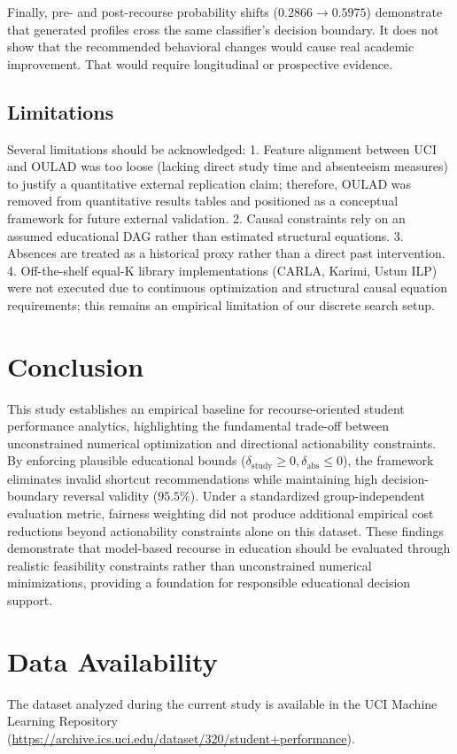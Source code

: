\documentclass[11pt]{article}
\newcommand{\hlblock}[1]{\vspace{1mm}\noindent\colorbox{yellow!30}{\parbox{\dimexpr\linewidth-2\fboxsep\relax}{\sloppy #1\par}}\vspace{1mm}}
\begin{document}
\hlblock{Finally, pre- and post-recourse probability shifts ($0.2866 \to 0.5975$) demonstrate that generated profiles cross the same classifier's decision boundary. It does not show that the recommended behavioral changes would cause real academic improvement. That would require longitudinal or prospective evidence.}

\subsection{Limitations}

Several limitations should be acknowledged:
1. Feature alignment between UCI and OULAD was too loose (lacking direct study time and absenteeism measures) to justify a quantitative external replication claim; therefore, OULAD was removed from quantitative results tables and positioned as a conceptual framework for future external validation.
2. Causal constraints rely on an assumed educational DAG rather than estimated structural equations.
3. Absences are treated as a historical proxy rather than a direct past intervention.
4. Off-the-shelf equal-K library implementations (CARLA, Karimi, Ustun ILP) were not executed due to continuous optimization and structural causal equation requirements; this remains an empirical limitation of our discrete search setup.

\section{Conclusion}
\label{sec:conclusion}

\hlblock{This study establishes an empirical baseline for recourse-oriented student performance analytics, highlighting the fundamental trade-off between unconstrained numerical optimization and directional actionability constraints. By enforcing plausible educational bounds ($\delta_{\text{study}} \ge 0, \delta_{\text{abs}} \le 0$), the framework eliminates invalid shortcut recommendations while maintaining high decision-boundary reversal validity ($95.5\%$). Under a standardized group-independent evaluation metric, fairness weighting did not produce additional empirical cost reductions beyond actionability constraints alone on this dataset. These findings demonstrate that model-based recourse in education should be evaluated through realistic feasibility constraints rather than unconstrained numerical minimizations, providing a foundation for responsible educational decision support.}

\section*{Data Availability}
The dataset analyzed during the current study is available in the UCI Machine Learning Repository (\url{https://archive.ics.uci.edu/dataset/320/student+performance}).
\end{document}
